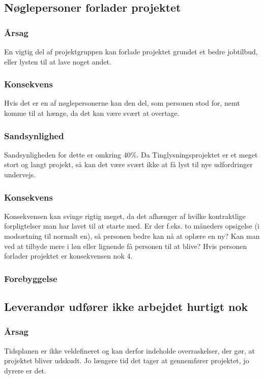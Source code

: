 \documentclass[10pt,a4paper,danish]{article}
\begin{document}
\subsection{Nøglepersoner forlader projektet}
\subsubsection{Årsag}
En vigtig del af projektgruppen kan forlade projektet grundet et bedre jobtilbud, eller lysten til at lave noget andet.

\subsubsection{Konsekvens}
Hvis det er en af nøglepersonerne kan den del, som personen stod for, nemt komme til at hænge, da det kan være svært at overtage. 

\subsubsection{Sandsynlighed}
Sandsynligheden for dette er omkring 40\%. Da Tinglysningsprojektet er et meget stort og langt projekt, så kan det være svært ikke at få lyst til nye udfordringer undervejs.

\subsubsection{Konsekvens}
Konsekvensen kan svinge rigtig meget, da det afhænger af hvilke kontraktlige forpligtelser man har lavet til at starte med. Er der f.eks. to måneders opsigelse (i modsætning til normalt en), så personen bedre kan nå at oplære en ny? Kan man ved at tilbyde mere i løn eller lignende få personen til at blive? Hvis personen forlader projektet er konsekvensen nok 4.

\subsubsection{Forebyggelse}




\subsection{Leverandør udfører ikke arbejdet hurtigt nok}
\subsubsection{Årsag}
Tidsplanen er ikke veldefineret og kan derfor indeholde overraskelser, der gør, at projektet bliver udskudt. Jo længere tid det tager at gennemfører projektet, jo dyrere er det.
\end{document}
